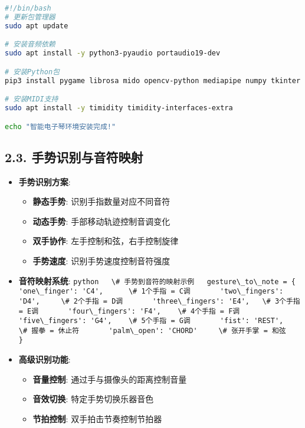 \begin{lstlisting}[language=bash]
#!/bin/bash
# 更新包管理器
sudo apt update

# 安装音频依赖
sudo apt install -y python3-pyaudio portaudio19-dev

# 安装Python包
pip3 install pygame librosa mido opencv-python mediapipe numpy tkinter matplotlib

# 安装MIDI支持
sudo apt install -y timidity timidity-interfaces-extra

echo "智能电子琴环境安装完成!"
\end{lstlisting}

\subsection{2.3.
手势识别与音符映射}\label{ux624bux52bfux8bc6ux522bux4e0eux97f3ux7b26ux6620ux5c04}

\begin{itemize}
\item
  \textbf{手势识别方案}:

  \begin{itemize}
  \tightlist
  \item
    \textbf{静态手势}: 识别手指数量对应不同音符
  \item
    \textbf{动态手势}: 手部移动轨迹控制音调变化
  \item
    \textbf{双手协作}: 左手控制和弦，右手控制旋律
  \item
    \textbf{手势速度}: 识别手势速度控制音符强度
  \end{itemize}
\item
  \textbf{音符映射系统}:
  \passthrough{\lstinline!python   \# 手势到音符的映射示例   gesture\_to\_note = \{       'one\_finger': 'C4',      \# 1个手指 = C调       'two\_fingers': 'D4',     \# 2个手指 = D调       'three\_fingers': 'E4',   \# 3个手指 = E调       'four\_fingers': 'F4',    \# 4个手指 = F调       'five\_fingers': 'G4',    \# 5个手指 = G调       'fist': 'REST',          \# 握拳 = 休止符       'palm\_open': 'CHORD'     \# 张开手掌 = 和弦   \}!}
\item
  \textbf{高级识别功能}:

  \begin{itemize}
  \tightlist
  \item
    \textbf{音量控制}: 通过手与摄像头的距离控制音量
  \item
    \textbf{音效切换}: 特定手势切换乐器音色
  \item
    \textbf{节拍控制}: 双手拍击节奏控制节拍器
  \end{itemize}
\end{itemize}


